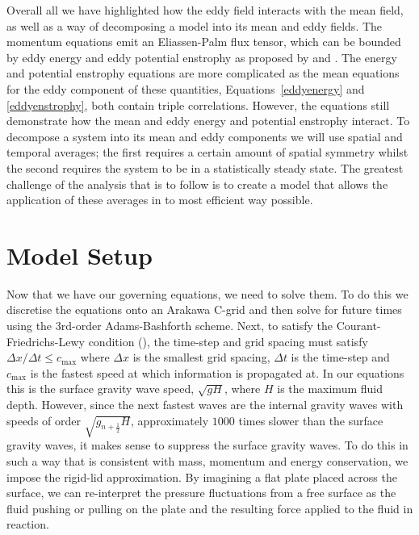 \documentclass[12pt,a4paper]{report}
\newcommand*{\half}{\frac{1}{2}}
\begin{document}
            Overall all we have highlighted how the eddy field interacts with the mean
            field, as well as a way of decomposing a model into its mean and eddy fields.
            The momentum equations emit an Eliassen-Palm flux tensor, which can
            be bounded by eddy energy and eddy potential enstrophy as proposed
            by \cite{marshall2012framework} and \cite{maddison2013eliassen}. 
            The energy and potential enstrophy equations are more complicated
            as the mean equations for the eddy component of these quantities,
            Equations~\eqref{eddyenergy} and \eqref{eddyenstrophy}, both contain
            triple correlations. However, the equations still demonstrate how
            the mean and eddy energy and potential enstrophy interact.
            To decompose a system into its mean and eddy components we will
            use spatial and temporal averages; the first requires a certain
            amount of spatial symmetry whilst the second requires the system to be
            in a statistically steady state. The greatest challenge of the analysis
            that is to follow is to create a model that allows the application of 
            these averages in to most efficient way possible.
            
                            
    

\section{Model Setup}

Now that we have our governing equations, we need to solve them. To do this we
discretise the equations onto an Arakawa C-grid and then solve for future times
using the 3rd-order Adams-Bashforth scheme. Next, to satisfy the Courant-Friedrichs-Lewy
 condition (\cite{courant1928partiellen}), the time-step and grid spacing must satisfy ${\Delta x}/{\Delta t} \leq c_{\max}$ where $\Delta x$ is the smallest grid spacing, $\Delta t$ is
 the time-step and $c_{\max}$ is the fastest speed at which information is propagated at. 
 In our equations this is the surface gravity wave speed, $\sqrt{g H}$, where $H$ is the
 maximum fluid depth. However, since the next fastest waves are the internal gravity
  waves with speeds of order $\sqrt{g_{n+\half} H}$, approximately $1000$ times slower than the surface gravity waves, it makes sense to suppress the surface gravity
  waves. To do this in such a way that is consistent with mass, momentum and energy 
  conservation, we impose the rigid-lid approximation. By imagining a flat plate 
  placed across the surface, we can re-interpret the pressure fluctuations from a free
  surface as the fluid pushing or pulling on the plate and the resulting force 
  applied to the fluid in reaction. 
  
\end{document}
